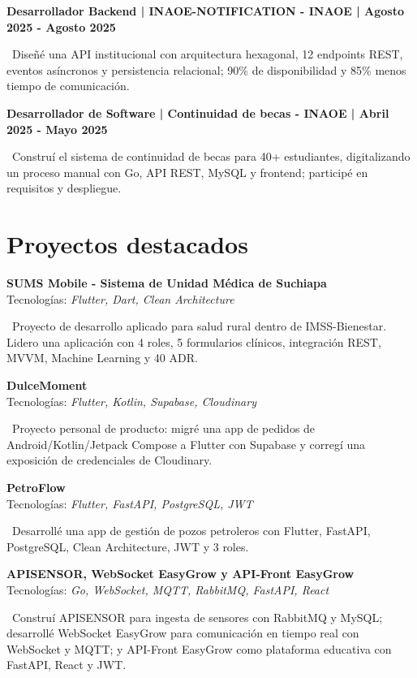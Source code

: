 \documentclass[9pt,letterpaper]{article}
\newcommand{\cvbullet}[1]{\par\noindent\textbullet\ #1\par}
\begin{document}
\textbf{Desarrollador Backend | INAOE-NOTIFICATION - INAOE | Agosto 2025 - Agosto 2025}\\
\cvbullet{Diseñé una API institucional con arquitectura hexagonal, 12 endpoints REST, eventos asíncronos y persistencia relacional; 90\% de disponibilidad y 85\% menos tiempo de comunicación.}

\textbf{Desarrollador de Software | Continuidad de becas - INAOE | Abril 2025 - Mayo 2025}\\
\cvbullet{Construí el sistema de continuidad de becas para 40+ estudiantes, digitalizando un proceso manual con Go, API REST, MySQL y frontend; participé en requisitos y despliegue.}

\section*{Proyectos destacados}
\textbf{SUMS Mobile - Sistema de Unidad Médica de Suchiapa}\\
Tecnologías: \textit{Flutter, Dart, Clean Architecture}
\cvbullet{Proyecto de desarrollo aplicado para salud rural dentro de IMSS-Bienestar. Lidero una aplicación con 4 roles, 5 formularios clínicos, integración REST, MVVM, Machine Learning y 40 ADR.}
\textbf{DulceMoment}\\
Tecnologías: \textit{Flutter, Kotlin, Supabase, Cloudinary}
\cvbullet{Proyecto personal de producto: migré una app de pedidos de Android/Kotlin/Jetpack Compose a Flutter con Supabase y corregí una exposición de credenciales de Cloudinary.}
\textbf{PetroFlow}\\
Tecnologías: \textit{Flutter, FastAPI, PostgreSQL, JWT}
\cvbullet{Desarrollé una app de gestión de pozos petroleros con Flutter, FastAPI, PostgreSQL, Clean Architecture, JWT y 3 roles.}
\textbf{APISENSOR, WebSocket EasyGrow y API-Front EasyGrow}\\
Tecnologías: \textit{Go, WebSocket, MQTT, RabbitMQ, FastAPI, React}
\cvbullet{Construí APISENSOR para ingesta de sensores con RabbitMQ y MySQL; desarrollé WebSocket EasyGrow para comunicación en tiempo real con WebSocket y MQTT; y API-Front EasyGrow como plataforma educativa con FastAPI, React y JWT.}
\end{document}
